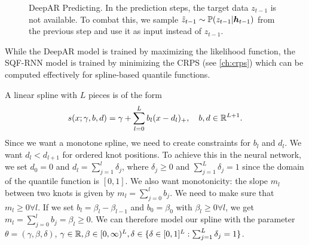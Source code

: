 \begin{figure}[h]%
    \centering
    
    \caption[DeepAR Predicting]{DeepAR Predicting. 
    In the prediction steps, the target data \(z_{t-1}\) is not available. 
    To combat this, we sample \(\tilde{z}_{t-1} \sim \P(z_{t-1} | \boldsymbol{h}_{t-1})\) 
    from the previous step and use it as input instead of \(z_{t-1}\).}%
    \label{fig:deepar-predicting}%
\end{figure}

While the DeepAR model is trained by maximizing the likelihood function, 
the SQF-RNN model is trained by minimizing the CRPS (see \ref{ch:crps}) 
which can be computed effectively for spline-based quantile functions.

A linear spline with \(L\) pieces is of the form 
\[ s(x; \gamma, b, d) = \gamma + \sum_{l=0}^L b_l (x - d_l)_+, 
\quad b, d \in \R^{L+1}. \]
Since we want a monotone spline, we need to create constraints for \(b_l\) and \(d_l\).
We want \(d_l < d_{l+1}\) for ordered knot positions. To achieve this 
in the neural network, we set \(d_0 = 0\) and \(d_l = \sum_{j=1}^l \delta_j\), 
where \(\delta_j \geq 0\) and \(\sum_{j=1}^L \delta_j = 1\) since the domain 
of the quantile function is \([0, 1]\). 
We also want monotonicity: the slope \(m_l\) between two knots is given by 
\(m_l = \sum_{j=0}^l b_j\). We need to make sure that \(m_l \geq 0 \forall l\).
If we set \(b_l = \beta_l - \beta_{l-1}\) and \(b_0 = \beta_0\) with \(\beta_l \geq 0 \forall l\), 
we get \(m_l = \sum_{j=0}^l b_j = \beta_l \geq 0\).
We can therefore model our spline with the parameter 
\(\theta = (\gamma, \beta, \delta)\), \(\gamma \in \R, \beta \in [0,\infty)^{L}, 
\delta \in \set{ \delta \in [0,1]^L: \sum_{j=1}^L \delta_j = 1 }\).